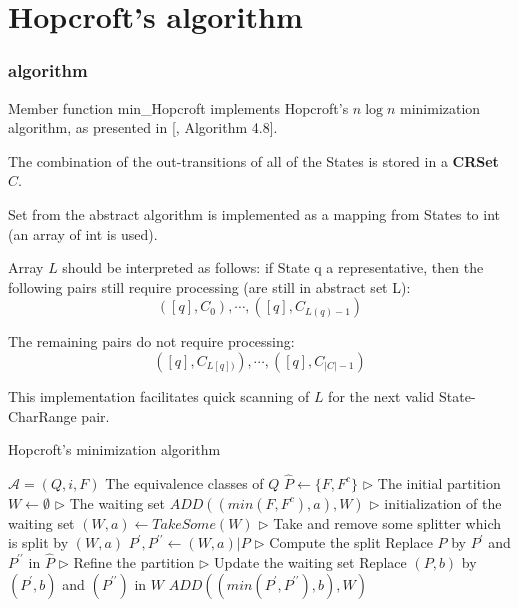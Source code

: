 \chapter{Hopcroft's algorithm}

\subsection{algorithm}

Member function min\_Hopcroft implements Hopcroft's $n\log n$ minimization algorithm, as presented in [\cite{WATSON94b}, Algorithm 4.8].

The combination of the out-transitions of all of the States is stored in a
\textbf{CRSet $C$}. 

Set  from the abstract algorithm is implemented as a mapping from States to int (an array of int is used). 

Array $L$ should be interpreted as follows: if State q a representative,
then the following pairs still require processing (are still in abstract set L):
$$([q], C_0),\cdots, ([q], C_{L(q)-1}) $$

The remaining pairs do not require processing:
$$([q], C_{L[q])}),\cdots, ([q], C_{|C|-1}) $$

This implementation facilitates quick scanning of $L$ for the next valid State-CharRange pair.

\begin{algorithm}  
	\caption{Hopcroft's minimization algorithm}  \label{alg:hopcroft}
	\begin{algorithmic}[1] %
		\Require $\mathcal{A}=(Q,i,F)$  
		\Ensure The equivalence classes of $Q$  
		\State $\hat{P} \gets \{F,F^c \}$  \qquad\qquad $\triangleright$ The initial partition
		\State $W\gets \emptyset$  \qquad\qquad $\triangleright$ The waiting set
		\State $ADD((min(F,F^c),a),W)$ \qquad\qquad $\triangleright$ initialization of the waiting set
		\EndFor
		\State $(W,a)\gets TakeSome(W)$ \qquad\qquad $\triangleright$ Take and remove some splitter
		 which is split by $(W,a)$
		\State $P^{\prime},P^{\prime\prime}\gets (W,a)|P$ \qquad\qquad $\triangleright$ Compute the split
		\State Replace $P$ by $P^\prime$ and $P^{\prime\prime}$ in $\hat{P}$ \qquad\qquad $\triangleright$ Refine the partition
		\EndFor 
		  \qquad\qquad $\triangleright$ Update the waiting set
		\State Replace $(P,b)$ by $(P^\prime,b)$ and $(P^{\prime\prime})$ in $W$
		\Else
		\State $ADD((min(P^\prime,P^{\prime\prime}),b),W)$
		\EndIf  
		\EndFor
		\EndWhile
	\end{algorithmic}
\end{algorithm}

